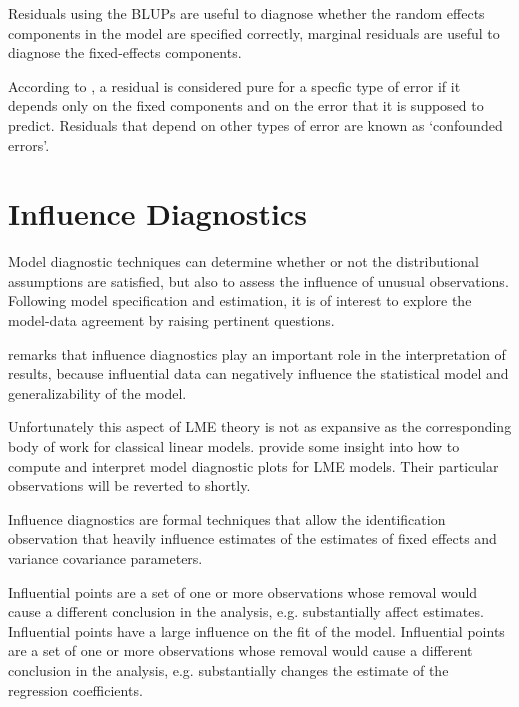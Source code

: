 \documentclass[12pt, a4paper]{report}
\theoremstyle{definition}
\theoremstyle{remark}
\begin{document}
Residuals using the BLUPs are useful to diagnose whether the random effects components in the model are specified correctly, marginal residuals are useful to diagnose the fixed-effects components.


According to \citet{hilden1995}, a residual is considered pure for a specfic type of error if it depends only on the fixed components and on the error that it is supposed to predict. Residuals that depend on other types of error are known as `confounded errors'.





%
%



\section{Influence Diagnostics}
Model diagnostic techniques can determine whether or not the distributional assumptions are satisfied, but also to assess the influence of unusual observations. Following model specification and estimation, it is of interest to explore the model-data agreement by raising pertinent questions. 

\citet{west} remarks that influence diagnostics play an important role in the interpretation of results, because influential data can negatively influence the statistical model and generalizability of the model. 
 

Unfortunately this aspect of LME theory is not as expansive as the corresponding body of work for classical linear models. \citet{PB} provide some insight into how to compute and interpret model diagnostic plots for LME models. Their particular observations will be reverted to shortly. 


Influence diagnostics are formal techniques that allow the identification observation that heavily influence estimates of the estimates of fixed effects and variance covariance parameters.


Influential points are a set of one or more observations whose removal would cause a different conclusion in the analysis, e.g. substantially affect estimates. 
Influential points have a large influence on the fit of the model. Influential points are a set of one or more observations whose removal would cause a different conclusion in the analysis, e.g. substantially changes the estimate of the regression coefficients. 
\end{document}
